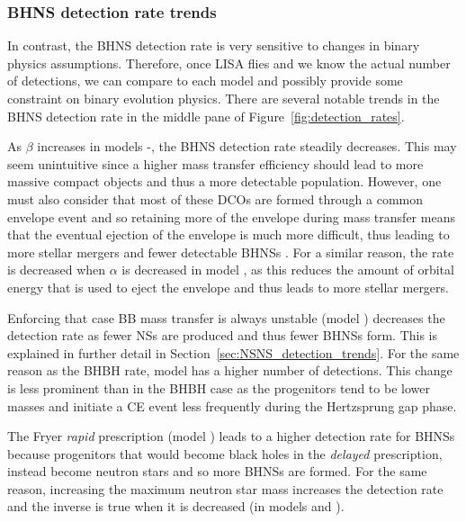 \subsubsection{BHNS detection rate trends}
In contrast, the BHNS detection rate is very sensitive to changes in binary physics assumptions. Therefore, once LISA flies and we know the actual number of detections, we can compare to each model and possibly provide some constraint on binary evolution physics. There are several notable trends in the BHNS detection rate in the middle pane of Figure~\ref{fig:detection_rates}.

As $\beta$ increases in models \modBetaLow{}-\modBetaHigh{}, the BHNS detection rate steadily decreases. This may seem unintuitive since a higher mass transfer efficiency should lead to more massive compact objects and thus a more detectable population. However, one must also consider that most of these DCOs are formed through a common envelope event and so retaining more of the envelope during mass transfer means that the eventual ejection of the envelope is much more difficult, thus leading to more stellar mergers and fewer detectable BHNSs \citep[e.g.][]{Kruckow+2018}. For a similar reason, the rate is decreased when $\alpha$ is decreased in model \modAlphaLow{}, as this reduces the amount of orbital energy that is used to eject the envelope and thus leads to more stellar mergers. 

Enforcing that case BB mass transfer is always unstable (model \modCaseBB{}) decreases the detection rate as fewer NSs are produced and thus fewer BHNSs form. This is explained in further detail in Section~\ref{sec:NSNS_detection_trends}. For the same reason as the BHBH rate, model \modOpt{} has a higher number of detections. This change is less prominent than in the BHBH case as the progenitors tend to be lower masses and initiate a CE event less frequently during the Hertzsprung gap phase. 

The Fryer \textit{rapid} prescription (model \modRapid{}) leads to a higher detection rate for BHNSs because progenitors that would become black holes in the \textit{delayed} prescription, instead become neutron stars and so more BHNSs are formed. For the same reason, increasing the maximum neutron star mass increases the detection rate and the inverse is true when it is decreased (in models \modNSLow{} and \modNSHigh{}).

